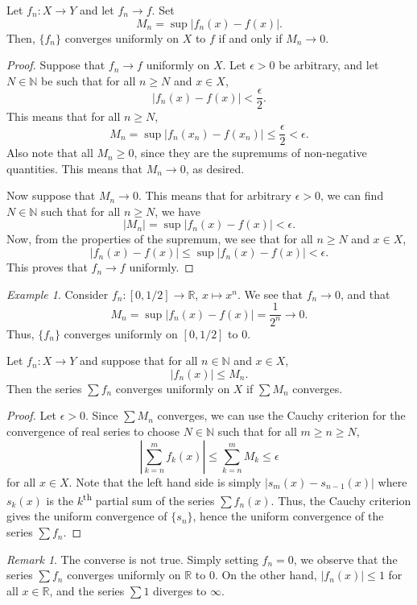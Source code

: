 \documentclass[11pt]{article}
\def\R{\mathbb{R}}
\def\N{\mathbb{N}}
\theoremstyle{definition}
\theoremstyle{remark}
\newtheorem*{remark}{Remark}
\newtheorem*{example}{Example}
\numberwithin{equation}{module}
\begin{document}
    \begin{theorem}
        Let $f_n\colon X \to Y$ and let $f_n \to f$. Set \[
            M_n = \sup |f_n(x) - f(x)|.
        \]
        Then, $\{f_n\}$ converges uniformly on $X$ to $f$ if and only if $M_n \to
        0$.
    \end{theorem}
    \begin{proof}
        Suppose that $f_n \to f$ uniformly on $X$.
        Let $\epsilon > 0$ be arbitrary, and let $N \in \N$ be such that
        for all $n \geq N$ and $x \in X$, \[
            |f_n(x) - f(x)| < \frac{\epsilon}{2}.
        \]
        This means that for all $n \geq N$, \[
            M_n = \sup |f_n(x_n) - f(x_n)| \leq \frac{\epsilon}{2} < \epsilon.
        \]
        Also note that all $M_n \geq 0$, since they are the supremums of non-negative
        quantities.
        This means that $M_n \to 0$, as desired.

        Now suppose that $M_n \to 0$. This means that for arbitrary $\epsilon > 0$,
        we can find $N \in \N$ such that for all $n \geq N$, we have \[
            |M_n| = \sup |f_n(x) - f(x)| < \epsilon.
        \] 
        Now, from the properties of the supremum, we see that for all $n \geq N$ and
        $x \in X$, \[
            |f_n(x) - f(x)| \leq \sup |f_n(x) - f(x)| < \epsilon.
        \] 
        This proves that $f_n \to f$ uniformly.
    \end{proof} 
    \begin{example}
        Consider $f_n\colon [0, 1 /2] \to \R$, $x \mapsto x^n$. We see that $f_n \to
        0$, and that \[
            M_n = \sup|f_n(x) - f(x)| = \frac{1}{2^n} \to 0.
        \] 
        Thus, $\{f_n\}$ converges uniformly on $[0, 1 /2]$ to $0$.
    \end{example}

    \begin{theorem}
        Let $f_n\colon X \to Y$ and suppose that for all $n \in \N$ and $x \in X$,
        \[
            |f_n(x)| \leq M_n.
        \]
        Then the series $\sum f_n$ converges uniformly on $X$ if $\sum M_n$
        converges.
    \end{theorem}
    \begin{proof}
        Let $\epsilon > 0$. Since $\sum M_n$ converges, we can use the Cauchy
        criterion for the convergence of real series to choose $N \in \N$ such that
        for all $m \geq n \geq N$, \[
            \left|\sum_{k = n}^m f_k(x)\right| \leq \sum_{k = n}^m M_k \leq \epsilon
        \] for all $x \in X$.
        Note that the left hand side is simply $|s_m(x) - s_{n - 1}(x)|$ where
        $s_k(x)$ is the $k$\textsuperscript{th} partial sum of the series $\sum
        f_n(x)$. Thus, the Cauchy criterion gives the uniform convergence of 
        $\{s_n\}$, hence the uniform convergence of the series $\sum f_n$.
    \end{proof}
    \begin{remark}
        The converse is not true. Simply setting $f_n = 0$, we observe that the
        series $\sum f_n$ converges uniformly on $\R$ to $0$. On the other hand,
        $|f_n(x)| \leq 1$ for all $x \in \R$, and the series $\sum 1$ diverges to
        $\infty$.
    \end{remark}
\end{document}
